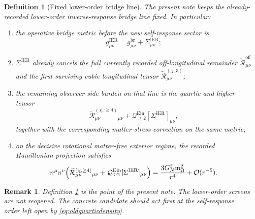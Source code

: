 \documentclass[11pt]{article}
\newcommand{\ObserverMetric}{g^{\mathrm{br}}}
\newcommand{\BaseShift}{\Sigma^{\mathrm{IER}}}
\newcommand{\HamChargeOmega}{\mathfrak m_\Omega}
\newcommand{\ReOff}{\widetilde{\mathcal R}_{\mu\nu}^{\mathrm{off}}}
\newcommand{\ReLongThree}{\widetilde{\mathcal R}_{\mu\nu}^{(\chi,3)}}
\newcommand{\ReLongFour}{\widetilde{\mathcal R}_{\mu\nu}^{(\chi,\ge 4)}}
\newcommand{\EinQuad}{\mathcal Q_{\ge 2}^{\mathrm{Ein}}}
\newtheorem{definition}{Definition}
\newtheorem{remark}{Remark}
\begin{document}
\begin{definition}[Fixed lower-order bridge line]
\label{def:fixed}
The present note keeps the already-recorded lower-order inverse-response bridge line fixed. In particular:
\begin{enumerate}
    \item the operative bridge metric before the new self-response sector is
    \begin{equation}
    g_{\mu\nu}^{\mathrm{IER}}
    =
    \ObserverMetric_{\mu\nu}
    +\BaseShift_{\mu\nu};
    \label{eq:gier}
    \end{equation}
    \item \(\BaseShift\) already cancels the full currently recorded off-longitudinal remainder \(\ReOff\) and the first surviving cubic longitudinal tensor \(\ReLongThree\);
    \item the remaining observer-side burden on that line is the quartic-and-higher tensor
    \begin{equation}
    \ReLongFour{}_{\mu\nu}
    +\EinQuad[\BaseShift]_{\mu\nu},
    \label{eq:oldquartictensor}
    \end{equation}
    together with the corresponding matter-stress correction on the same metric;
    \item on the decisive rotational matter-free exterior regime, the recorded Hamiltonian projection satisfies
    \begin{equation}
    n^\mu n^\nu
    \Bigl(
    \ReLongFour{}_{\mu\nu}
    +\EinQuad[\BaseShift]_{\mu\nu}
    \Bigr)
    =
    \frac{3G_N^2\HamChargeOmega^2}{r^4}
    +\mathcal O(r^{-5}).
    \label{eq:oldquarticdensity}
    \end{equation}
\end{enumerate}
\end{definition}

\begin{remark}
Definition \ref{def:fixed} is the point of the present note. The lower-order screens are not reopened. The concrete candidate should act first at the self-response order left open by \eqref{eq:oldquarticdensity}.
\end{remark}
\end{document}
